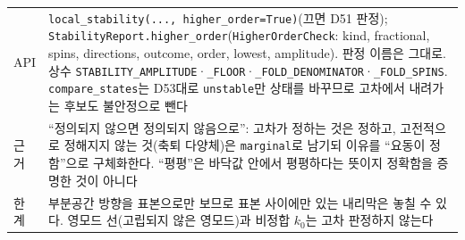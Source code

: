 \begin{tabularx}{\textwidth}{@{}P{3.0cm}Y@{}}
    API & \texttt{local\_stability(..., higher\_order=True)}(끄면 D51 판정); \texttt{StabilityReport.higher\_order}(\texttt{HigherOrderCheck}: kind, fractional, spins, directions, outcome, order, lowest, amplitude). 판정 이름은 그대로. 상수 \texttt{STABILITY\_AMPLITUDE}·\texttt{\_FLOOR}·\texttt{\_FOLD\_DENOMINATOR}·\texttt{\_FOLD\_SPINS}. \texttt{compare\_states}는 D53대로 \texttt{unstable}만 상태를 바꾸므로 고차에서 내려가는 후보도 불안정으로 뺀다 \\
    근거 & ``정의되지 않으면 정의되지 않음으로'': 고차가 정하는 것은 정하고, 고전적으로 정해지지 않는 것(축퇴 다양체)은 \texttt{marginal}로 남기되 이유를 ``요동이 정함''으로 구체화한다. ``평평''은 바닥값 안에서 평평하다는 뜻이지 정확함을 증명한 것이 아니다 \\
    한계 & 부분공간 방향을 표본으로만 보므로 표본 사이에만 있는 내리막은 놓칠 수 있다. 영모드 선(고립되지 않은 영모드)과 비정합 $k_0$는 고차 판정하지 않는다 \\
    \bottomrule
  \end{tabularx}
\endgroup


